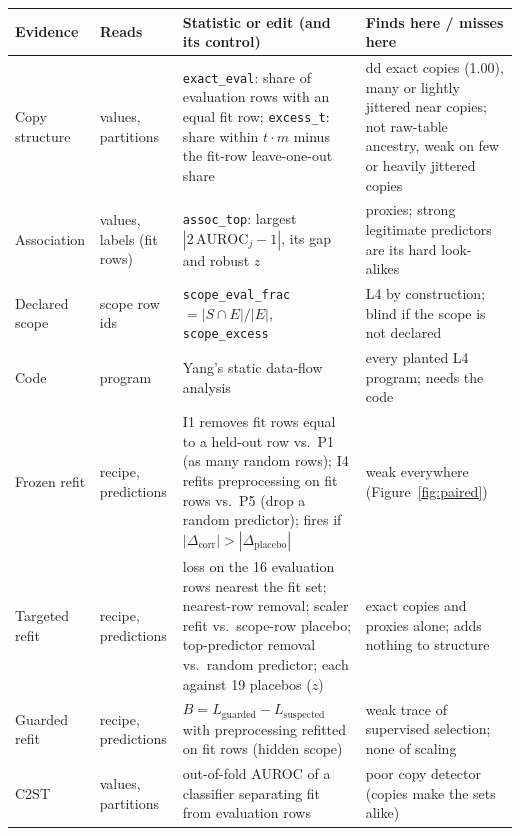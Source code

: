 \begin{tabular}{@{}p{1.7cm}p{1.9cm}p{5.4cm}p{4.1cm}@{}}
\toprule
Evidence & Reads & Statistic or edit (and its control) & Finds here / misses here\\
\midrule
Copy structure & values, partitions & \texttt{exact\_eval}: share of evaluation rows with an equal fit row; \texttt{excess\_t}: share within $t\cdot m$ minus the fit-row leave-one-out share & dd exact copies (1.00), many or lightly jittered near copies; not raw-table ancestry, weak on few or heavily jittered copies\\
Association & values, labels (fit rows) & \texttt{assoc\_top}: largest $|2\,\mathrm{AUROC}_j-1|$, its gap and robust $z$ & proxies; strong legitimate predictors are its hard look-alikes\\
Declared scope & scope row ids & \texttt{scope\_eval\_frac} $=|S\cap E|/|E|$, \texttt{scope\_excess} & L4 by construction; blind if the scope is not declared\\
Code & program & Yang's static data-flow analysis & every planted L4 program; needs the code\\
Frozen refit & recipe, predictions & I1 removes fit rows equal to a held-out row vs.\ P1 (as many random rows); I4 refits preprocessing on fit rows vs.\ P5 (drop a random predictor); fires if $|\Delta_{\mathrm{corr}}|>|\Delta_{\mathrm{placebo}}|$ & weak everywhere (Figure~\ref{fig:paired})\\
Targeted refit & recipe, predictions & loss on the 16 evaluation rows nearest the fit set; nearest-row removal; scaler refit vs.\ scope-row placebo; top-predictor removal vs.\ random predictor; each against 19 placebos ($z$) & exact copies and proxies alone; adds nothing to structure\\
Guarded refit & recipe, predictions & $B=L_{\mathrm{guarded}}-L_{\mathrm{suspected}}$ with preprocessing refitted on fit rows (hidden scope) & weak trace of supervised selection; none of scaling\\
C2ST & values, partitions & out-of-fold AUROC of a classifier separating fit from evaluation rows & poor copy detector (copies make the sets alike)\\
\bottomrule
\end{tabular}
